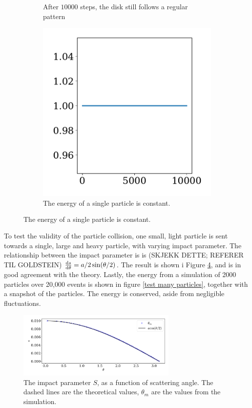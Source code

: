 \documentclass{article}
\begin{document}
\begin{figure}
\begin{subfigure}{.35\textwidth}
                \caption{After $10 000$ steps, the disk still follows a regular pattern}
                \label{single particle}
            \end{subfigure}
            \begin{subfigure}{.65\textwidth}
                \includegraphics[width=.8\textwidth]{../plots/test_case_one_particle/energy.pdf}
                \caption{The energy of a single particle is constant.}
                \label{single particle energy}
            \end{subfigure}
        \end{figure}
        
        To test the validity of the particle collision, one small, light particle is sent towards a single, large and heavy particle, with varying impact parameter. The relationship between the impact parameter is is (SKJEKK DETTE; REFERER TIL GOLDSTEIN) $\dv{s}{\theta} = a / 2 \sin(\theta / 2)$. The result is shown i Figure \ref{scattering}, and is in good agreement with the theory. Lastly, the energy from a simulation of 2000 particles over 20,000 events is shown in figure \ref{test many particles}, together with a snapshot of the particles. The energy is conserved, aside from negligible fluctuations.

        \begin{figure}
            \centering
            \hspace{-10mm}
            \includegraphics[width=0.7\textwidth]{../plots/test_case_collision_angle/collision_angle.pdf}
            \caption{The impact parameter $S$, as a function of scattering angle. The dashed lines are the theoretical values, $\theta_m$ are the values from the simulation.}
            \label{scattering}
        \end{figure}
\end{document}
